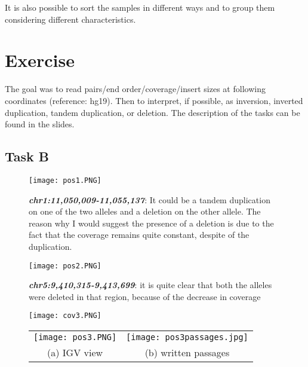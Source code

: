 It is also possible to sort the samples in different ways and to group them
considering different characteristics.


\section{Exercise}
The goal was to read pairs/end order/coverage/insert sizes at following
coordinates (reference: hg19). Then to interpret, if possible, as inversion, inverted duplication, tandem duplication, or deletion. The description of the tasks can be found in the slides.

\subsection{Task B}
\begin{figure}[H]
    \centering
    \texttt{[image: pos1.PNG]}
    \caption{\textit{\textbf{chr1:11,050,009-11,055,137}}: It could be a tandem
    duplication on one of the two alleles and a deletion on the other allele.
    The reason why I would suggest the presence of a deletion is due to the fact
    that the coverage remains quite constant, despite of the duplication.}
    \label{fig:task_B}
\end{figure}

\begin{figure}[H]
    \centering
    \texttt{[image: pos2.PNG]}
     \caption{\textbf{\textit{chr5:9,410,315-9,413,699}}: it is quite clear that both the alleles were deleted in that region, because of the decrease in coverage}
\end{figure}


\begin{figure}[H]
   \centering
   \texttt{[image: cov3.PNG]}
   \label{fig:cov3}
\end{figure}


\begin{figure}[H]
\begin{tabular}{cc}
  \texttt{[image: pos3.PNG]} &   \texttt{[image: pos3passages.jpg]} \\
(a) IGV view & (b) written passages \\[6pt]
\end{tabular}
\caption{}
\label{fig:ex_3}
\end{figure}



